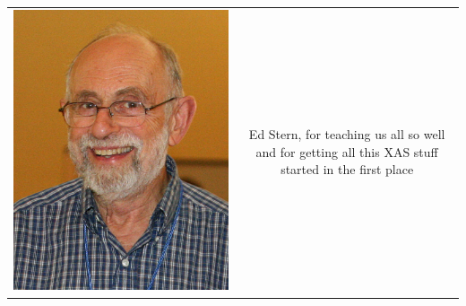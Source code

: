 \documentclass[10pt, xcolor=x11names, compress]{beamer}
\begin{document}
\begin{frame}
\begin{tabular}{cc}
\begin{minipage}{0.1\linewidth}
      \includegraphics[width=\linewidth]{mugs/ed.jpg}
    \end{minipage}&
    \begin{minipage}{0.7\linewidth}
      Ed Stern, for teaching us all so well and for getting all this XAS
      stuff started in the first place
    \end{minipage}
  \end{tabular}

  \medskip


\end{frame}
\end{document}
